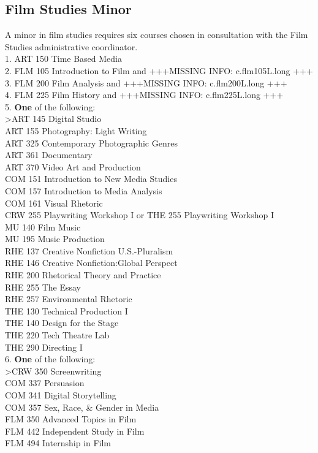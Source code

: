 \documentclass[
  letterpaper,
]{scrbook}
\begin{document}
\subsection{Film Studies Minor}\label{film-studies-minor}

A minor in film studies requires six courses chosen in consultation with
the Film Studies administrative coordinator.\\
1. ART 150 Time Based Media\\
2. FLM 105 Introduction to Film and +++MISSING INFO: c.flm105L.long
+++\\
3. FLM 200 Film Analysis and +++MISSING INFO: c.flm200L.long +++\\
4. FLM 225 Film History and +++MISSING INFO: c.flm225L.long +++\\
5. \textbf{One} of the following:\\
\textgreater ART 145 Digital Studio\\
ART 155 Photography: Light Writing\\
ART 325 Contemporary Photographic Genres\\
ART 361 Documentary\\
ART 370 Video Art and Production\\
COM 151 Introduction to New Media Studies\\
COM 157 Introduction to Media Analysis\\
COM 161 Visual Rhetoric\\
CRW 255 Playwriting Workshop I or THE 255 Playwriting Workshop I\\
MU 140 Film Music\\
MU 195 Music Production\\
RHE 137 Creative Nonfiction U.S.-Pluralism\\
RHE 146 Creative Nonfiction:Global Perspect\\
RHE 200 Rhetorical Theory and Practice\\
RHE 255 The Essay\\
RHE 257 Environmental Rhetoric\\
THE 130 Technical Production I\\
THE 140 Design for the Stage\\
THE 220 Tech Theatre Lab\\
THE 290 Directing I\\
6. \textbf{One} of the following:\\
\textgreater CRW 350 Screenwriting\\
COM 337 Persuasion\\
COM 341 Digital Storytelling\\
COM 357 Sex, Race, \& Gender in Media\\
FLM 350 Advanced Topics in Film\\
FLM 442 Independent Study in Film\\
FLM 494 Internship in Film
\end{document}

